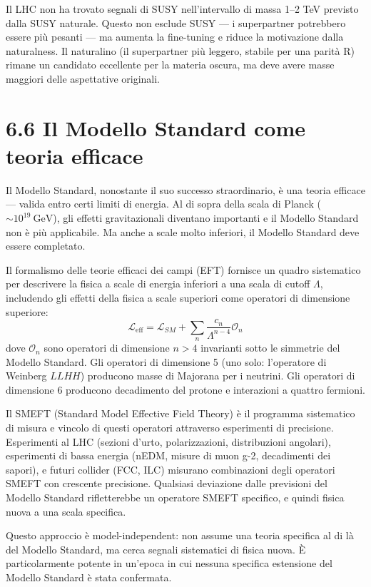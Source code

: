 \documentclass[11.5pt,a4paper,openany]{book}
\theoremstyle{remark}
\begin{document}
Il LHC non ha trovato segnali di SUSY nell'intervallo di massa 1--2 TeV previsto dalla SUSY naturale. Questo non esclude SUSY --- i superpartner potrebbero essere più pesanti --- ma aumenta la fine-tuning e riduce la motivazione dalla naturalness. Il naturalino (il superpartner più leggero, stabile per una parità R) rimane un candidato eccellente per la materia oscura, ma deve avere masse maggiori delle aspettative originali.

\section{6.6 Il Modello Standard come teoria efficace}

Il Modello Standard, nonostante il suo successo straordinario, è una teoria efficace --- valida entro certi limiti di energia. Al di sopra della scala di Planck ($\sim 10^{19}\ \text{GeV}$), gli effetti gravitazionali diventano importanti e il Modello Standard non è più applicabile. Ma anche a scale molto inferiori, il Modello Standard deve essere completato.

Il formalismo delle teorie efficaci dei campi (EFT) fornisce un quadro sistematico per descrivere la fisica a scale di energia inferiori a una scala di cutoff $\Lambda$, includendo gli effetti della fisica a scale superiori come operatori di dimensione superiore:
\[
\mathcal{L}_{\text{eff}} = \mathcal{L}_{SM} + \sum_n \frac{c_n}{\Lambda^{n-4}} \mathcal{O}_n
\]
dove $\mathcal{O}_n$ sono operatori di dimensione $n > 4$ invarianti sotto le simmetrie del Modello Standard. Gli operatori di dimensione 5 (uno solo: l'operatore di Weinberg $LLHH$) producono masse di Majorana per i neutrini. Gli operatori di dimensione 6 producono decadimento del protone e interazioni a quattro fermioni.

Il SMEFT (Standard Model Effective Field Theory) è il programma sistematico di misura e vincolo di questi operatori attraverso esperimenti di precisione. Esperimenti al LHC (sezioni d'urto, polarizzazioni, distribuzioni angolari), esperimenti di bassa energia (nEDM, misure di muon g-2, decadimenti dei sapori), e futuri collider (FCC, ILC) misurano combinazioni degli operatori SMEFT con crescente precisione. Qualsiasi deviazione dalle previsioni del Modello Standard rifletterebbe un operatore SMEFT specifico, e quindi fisica nuova a una scala specifica.

Questo approccio è model-independent: non assume una teoria specifica al di là del Modello Standard, ma cerca segnali sistematici di fisica nuova. È particolarmente potente in un'epoca in cui nessuna specifica estensione del Modello Standard è stata confermata.
\end{document}
